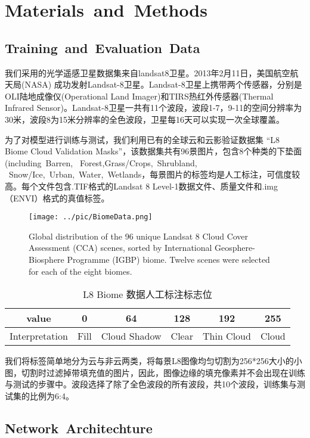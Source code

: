 \documentclass[UTF8]{ctexart}
\begin{document}
\section[]{Materials and Methods}
\subsection{Training and Evaluation Data}
我们采用的光学遥感卫星数据集来自landsat8卫星。2013年2月11日，美国航空航天局(NASA) 成功发射Landsat-8卫星。Landsat-8卫星上携带两个传感器，分别是OLI陆地成像仪(Operational Land Imager)和TIRS热红外传感器(Thermal Infrared Sensor)。Landsat-8卫星一共有11个波段，波段1-7，9-11的空间分辨率为30米，波段8为15米分辨率的全色波段，卫星每16天可以实现一次全球覆盖。

为了对模型进行训练与测试，我们利用已有的全球云和云影验证数据集
“L8 Biome Cloud Validation Masks”\cite{foga2017cloud_data}，该数据集共有96景图片，包含8个种类的下垫面(including Barren, 
Forest,Grass/Crops, Shrubland,
 Snow/Ice, Urban, Water, Wetlands，每景图片的标签均是人工标注，可信度较高。每个文件包含.TIF格式的Landsat 8 Level-1数据文件、质量文件和.img（ENVI）格式的真值标签。

\begin{figure}[ht]
    \centering
    \texttt{[image: ../pic/BiomeData.png]}
    \caption{Global distribution of the 96 unique Landsat 8 Cloud Cover Assessment (CCA) scenes, sorted by International Geosphere-Biosphere Programme (IGBP) biome. Twelve scenes were selected for each of the eight biomes.}
    \label{fig:label}
\end{figure}

\begin{table}[ht]
    \centering
    \begin{tabular}{c|ccccc}
    \hline
    \hline
    value& 0& 64& 128& 192& 255\\
    \hline
    Interpretation&	Fill& Cloud Shadow& Clear &Thin Cloud& Cloud\\
    \hline
    \hline
    \end{tabular}
    \caption{L8 Biome 数据人工标注标志位}
    \end{table}

我们将标签简单地分为云与非云两类，将每景L8图像均匀切割为256*256大小的小图，切割时过滤掉带填充值的图片，因此，图像边缘的填充像素并不会出现在训练与测试的步骤中。波段选择了除了全色波段的所有波段，共10个波段，训练集与测试集的比例为6:4。

\subsection{Network Architechture}
\end{document}
